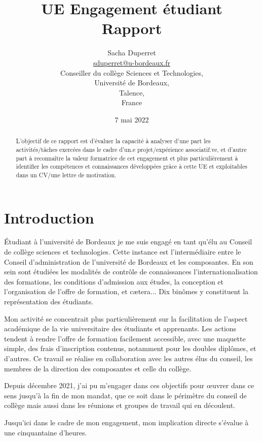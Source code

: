 \documentclass{article}
\title{{\huge UE Engagement étudiant\\Rapport}}
\author{$ $\\{\LARGE Sacha Duperret}\\ $ $\\ \href{mailto:sduperret@u-bordeaux.fr}{sduperret@u-bordeaux.fr}\\Conseiller du collège Sciences et Technologies,\\Université de Bordeaux,\\Talence,\\France}
\date{7 mai 2022}
\begin{document}
\maketitle

\vspace{20pt}

\tableofcontents

\vspace{50pt}

\begin{abstract}
L'objectif de ce rapport est d'évaluer la capacité à analyser d’une part les activités/tâches exercées dans le cadre d'un.e projet/expérience associatif.ve, et d’autre part à reconnaître la valeur formatrice de cet engagement et plus particulièrement à identifier les compétences et connaissances développées grâce à cette UE et exploitables dans un CV/une lettre de motivation.
\end{abstract}

\newpage \section*{Introduction}

Étudiant à l'université de Bordeaux je me suis engagé en tant qu'élu au Conseil de collège sciences et technologies. 
Cette instance est l’intermédiaire entre le Conseil d'administration de l'université de Bordeaux et les composantes. 
En son sein sont étudiées les modalités de contrôle de connaissances l’internationalisation des formations, les conditions d'admission aux études, la conception et l'organisation de l'offre de formation, et cætera... 
Dix binômes y constituent la représentation des étudiants. 

Mon activité se concentrait plus particulièrement sur la facilitation de l'aspect académique de la vie universitaire des étudiants et apprenants. 
Les actions tendent à rendre l’offre de formation facilement accessible, avec une maquette simple, des frais d'inscription contenus, notamment pour les doubles diplômes, et d'autres. 
Ce travail se réalise en collaboration avec les autres élus du conseil, les membres de la direction des composantes et celle du collège.

Depuis décembre 2021, j’ai pu m’engager dans ces objectifs pour œuvrer dans ce sens jusqu’à la fin de mon mandat, que ce soit dans le périmètre du conseil de collège mais aussi dans les réunions et groupes de travail qui en découlent. 

\newpage
Jusqu'ici dans le cadre de mon engagement, mon implication directe s’évalue à une cinquantaine d'heures. 
\end{document}
